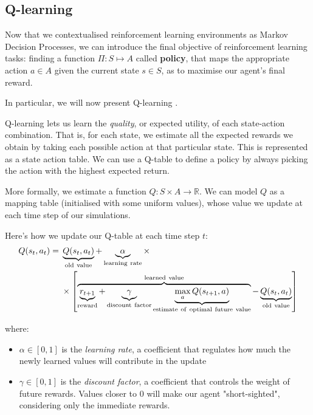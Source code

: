 \subsection{Q-learning}
\label{qlearning}
Now that we contextualised reinforcement learning environments as Markov Decision Processes, we can introduce the final objective of reinforcement learning tasks: finding a function $\Pi:S\mapsto A$ called \textbf{policy}, that maps the appropriate action $a\in A$ given the current state $s\in S$, as to maximise our agent's final reward.

In particular, we will now present Q-learning \parencite{watkins1992q}.

Q-learning lets us learn the \emph{quality}, or expected utility, of each state-action combination. That is, for each state, we estimate all the expected rewards we obtain by taking each possible action at that particular state. This is represented as a state action table. We can use a Q-table to define a policy by always picking the action with the highest expected return.

More formally, we estimate a function $Q: S \times A \to \mathbb{R}$. We can model $Q$ as a mapping table (initialised with some uniform values), whose value we update at each time step of our simulations.

Here's how we update our Q-table at each time step $t$:
\begin{equation} \label{eq:QlearningUpdate}
\begin{aligned}
  Q(s_{t},a_{t}) ={} & \underbrace{Q(s_t,a_t)}_{\rm old~value} +
  \underbrace{\alpha}_{\rm learning~rate} \times \\
   & \times \left[
    \overbrace{\underbrace{r_{t+1}}_{\rm reward} + \underbrace{\gamma}_{\rm
        discount~factor} \underbrace{\max_{a}Q(s_{t+1}, a)}_{\rm
        estimate~of~optimal~future~value}}^{\rm learned~value} -
    \underbrace{Q(s_t,a_t)}_{\rm old~value} \right]
\end{aligned}
\end{equation}

where:
\begin{itemize}
	\item $\alpha\in[0,1]$ is the \emph{learning rate}, a coefficient that regulates how much the newly learned values will contribute in the update
	\item $\gamma\in[0,1]$ is the \emph{discount factor}, a coefficient that controls the weight of future rewards. Values closer to 0 will make our agent "short-sighted", considering only the immediate rewards.
\end{itemize}

